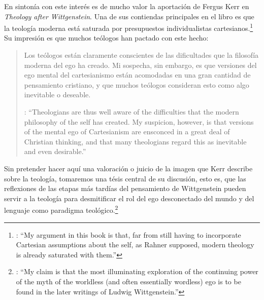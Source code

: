 En sintonía con este interés es de mucho valor la aportación de Fergus Kerr en \emph{Theology after Wittgenstein}. Una de sus contiendas principales en el libro es que la teología moderna está saturada por presupuestos individualistas cartesianos.\footnote{\cite[Cf.~][8]{kerr1997theo}: \enquote{My argument in this book is that, far from still having to incorporate Cartesian assumptions about the self, as Rahner supposed, modern theology is already saturated with them.}} Su impresión es que muchos teólogos han pactado con este hecho:\blockquote[{\cite[10]{kerr1997theo}}: \enquote{Theologians are thus well aware of the difficulties that the modern philosophy of the self has created. My suspicion, however, is that versions of the mental ego of Cartesianism are ensconced in a great deal of Christian thinking, and that many theologians regard this as inevitable and even desirable.}]{Los teólogos están claramente conscientes de las dificultades que la filosofía moderna del ego ha creado. Mi sospecha, sin embargo, es que versiones del ego mental del cartesianismo están acomodadas en una gran cantidad de pensamiento cristiano, y que muchos teólogos consideran esto como algo inevitable o deseable.} Sin pretender hacer aquí una valoración o juicio de la imagen que Kerr describe sobre la teología, tomaremos una tésis central de su discusión, esto es, que las reflexiones de las etapas más tardías del pensamiento de Wittgenstein pueden servir a la teología para desmitificar el rol del ego desconectado del mundo y del lenguaje como paradigma teológico.\footnote{\cite[Cf.~][23]{kerr1997theo}: \enquote{My claim is that the most illuminating exploration of the continuing power of the myth of the worldless (and often essentially wordless) ego is to be found in the later writings of Ludwig Wittgenstein.}}

